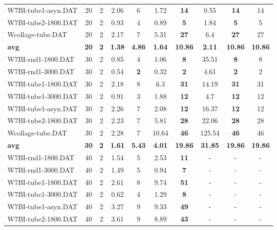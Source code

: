 \begin{table}[h]
\begin{tabular}{lccccccccc}
W7BI-tube1-asyn.DAT & 20 & 2 & 2.06 & 6 & 1.72 &  \textbf{14} &  \textcolor{blue2}{0.55} &  \textbf{14}  & 14 \\
W7BI-tube2-1800.DAT & 20 & 2 & 0.93 & 4 &  \textcolor{blue2}{0.89} &  \textbf{5} & 1.84 &  \textbf{5}  & 5 \\
Wcollage-tube.DAT & 20 & 2 &  \textcolor{blue2}{2.17} & 7 & 5.31 &  \textbf{27} & 6.4 &  \textbf{27}  & 27 \\
\cline{1-10} \textbf{avg} & \textbf{20} & \textbf{2} & \textbf{1.38} & \textbf{4.86} & \textbf{1.64} & \textbf{10.86} & \textbf{2.11} & \textbf{10.86} & \textbf{10.86} \\ \cline{1-10}
W7BI-rnd1-1800.DAT & 30 & 2 &  \textcolor{blue2}{0.85} & 4 & 1.06 &  \textbf{8} & 35.51 &  \textbf{8}  & 8 \\
W7BI-rnd1-3000.DAT & 30 & 2 & 0.54 &  \textbf{2} &  \textcolor{blue2}{0.32} &  \textbf{2} & 4.61 &  \textbf{2}  & 2 \\
W7BI-tube1-1800.DAT & 30 & 2 &  \textcolor{blue2}{2.18} & 8 & 6.3 &  \textbf{31} & 14.19 &  \textbf{31}  & 31 \\
W7BI-tube1-3000.DAT & 30 & 2 &  \textcolor{blue2}{0.91} & 3 & 1.88 &  \textbf{12} & 4.7 &  \textbf{12}  & 12 \\
W7BI-tube1-asyn.DAT & 30 & 2 & 2.26 & 7 &  \textcolor{blue2}{2.08} &  \textbf{12} & 16.37 &  \textbf{12}  & 12 \\
W7BI-tube2-1800.DAT & 30 & 2 &  \textcolor{blue2}{2.23} & 7 & 5.81 &  \textbf{28} & 22.06 &  \textbf{28}  & 28 \\
Wcollage-tube.DAT & 30 & 2 &  \textcolor{blue2}{2.28} & 7 & 10.64 &  \textbf{46} & 125.54 &  \textbf{46}  & 46 \\
\cline{1-10} \textbf{avg} & \textbf{30} & \textbf{2} & \textbf{1.61} & \textbf{5.43} & \textbf{4.01} & \textbf{19.86} & \textbf{31.85} & \textbf{19.86} & \textbf{19.86} \\ \cline{1-10}
W7BI-rnd1-1800.DAT & 40 & 2 & 1.54 & 5 & 2.53 &  \textbf{11} &  - &  -  & - \\
W7BI-rnd1-3000.DAT & 40 & 2 & 1.49 & 5 & 0.94 &  \textbf{7} &  - &  -  & - \\
W7BI-tube1-1800.DAT & 40 & 2 & 2.61 & 8 & 9.74 &  \textbf{51} &  - &  -  & - \\
W7BI-tube1-3000.DAT & 40 & 2 & 0.62 & 4 & 1.29 &  \textbf{8} &  - &  -  & - \\
W7BI-tube1-asyn.DAT & 40 & 2 & 3.27 & 9 & 9.33 &  \textbf{49} &  - &  -  & - \\
W7BI-tube2-1800.DAT & 40 & 2 & 3.61 & 9 & 8.89 &  \textbf{43} &  - &  -  & - \\

\end{tabular}
\end{table}
